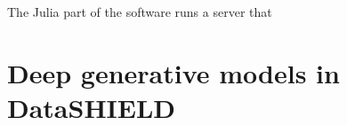 \documentclass[12pt]{article}
\newcommand{\apkg}[1]{\emph{#1}}
\begin{document}
 The Julia part of the software runs a server that 

%
%



\clearpage
\FloatBarrier
\section{Deep generative models in DataSHIELD}\label{deepgends}
\end{document}
